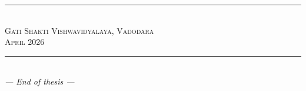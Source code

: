 \vfill
\begin{center}
\rule{0.5\textwidth}{0.4pt}\\[6pt]
\textsc{\small Gati Shakti Vishwavidyalaya, Vadodara}\\
\textsc{\small April 2026}\\[6pt]
\rule{0.5\textwidth}{0.4pt}\\[14pt]
{\itshape\color{gsvblue!80}--- End of thesis ---}
\end{center}

